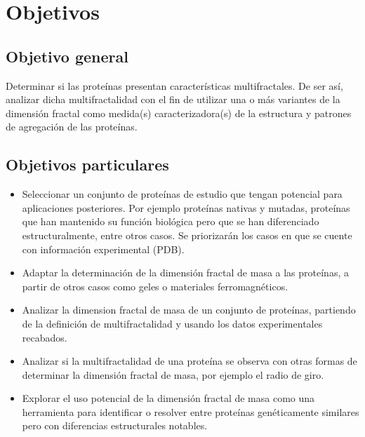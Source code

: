 \documentclass[11pt]{article}
\begin{document}
\section{Objetivos}
\subsection{Objetivo general}

Determinar si las prote\'{i}nas presentan caracter\'{i}sticas multifractales. De ser as\'{i}, analizar
dicha multifractalidad con el fin de utilizar una o m\'{a}s variantes de la
dimensi\'{o}n fractal como medida(s) caracterizadora(s)
de la estructura y patrones de agregaci\'{o}n de las prote\'{i}nas.


\subsection{Objetivos particulares}

\begin{itemize}

\item Seleccionar un conjunto de prote\'{i}nas de estudio que tengan potencial para aplicaciones posteriores.
Por ejemplo prote\'{i}nas nativas y mutadas, prote\'{i}nas que han mantenido su funci\'{o}n biol\'{o}gica pero que se
han diferenciado estructuralmente, entre otros casos. Se priorizar\'{a}n los casos en que se cuente con informaci\'{o}n
experimental (PDB).

\item Adaptar la determinaci\'{o}n de la dimensi\'{o}n fractal de masa a las prote\'{i}nas, a partir de otros casos como geles o materiales ferromagn\'{e}ticos.

\item Analizar la dimension fractal de masa de un conjunto de prote\'{i}nas, partiendo de la definici\'{o}n de multifractalidad y usando los datos experimentales recabados.

\item Analizar si la multifractalidad de una prote\'{i}na se observa con otras formas de determinar la
dimensi\'{o}n fractal de masa, por ejemplo el radio de giro.

\item Explorar el uso potencial de la dimensi\'{o}n fractal de masa como una herramienta para identificar
o resolver entre prote\'{i}nas gen\'{e}ticamente similares pero con diferencias estructurales notables.

\end{itemize}
\end{document}
